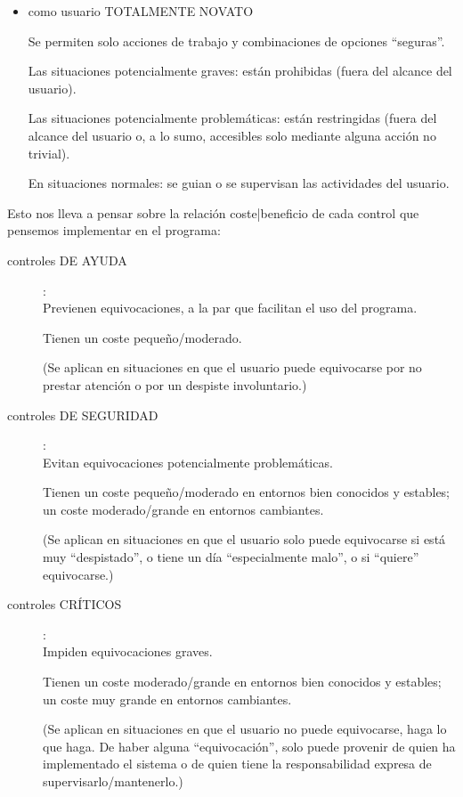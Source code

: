 \documentclass[spanish,12pt,a4paper,final,oneside]{book}
\begin{document}
\begin{itemize}
\item como usuario TOTALMENTE NOVATO

Se permiten solo acciones de trabajo y combinaciones de opciones ``seguras''.

Las situaciones potencialmente graves: están prohibidas (fuera del alcance del usuario).

Las situaciones potencialmente problemáticas: están restringidas (fuera del alcance del usuario o, a lo sumo, accesibles solo mediante alguna acción no trivial).

En situaciones normales: se guian o se supervisan las actividades del usuario.

\end{itemize}

Esto nos lleva a pensar sobre la relación coste|beneficio de cada control que pensemos implementar en el programa:
\begin{description}

\item[controles DE AYUDA]:\\Previenen equivocaciones, a la par que facilitan el uso del programa. 

Tienen un coste pequeño/moderado.

(Se aplican en situaciones en que el usuario puede equivocarse por no prestar atención o por un despiste involuntario.)

\item[controles DE SEGURIDAD]:\\Evitan equivocaciones potencialmente problemáticas. 

Tienen un coste pequeño/moderado en entornos bien conocidos y estables; un coste moderado/grande en entornos cambiantes.

(Se aplican en situaciones en que el usuario solo puede equivocarse si está muy ``despistado'', o tiene un día ``especialmente malo'', o si ``quiere'' equivocarse.)

\item[controles CRÍTICOS]:\\Impiden equivocaciones graves.

Tienen un coste moderado/grande en entornos bien conocidos y estables; un coste muy grande en entornos cambiantes.

(Se aplican en situaciones en que el usuario no puede equivocarse, haga lo que haga. De haber alguna ``equivocación'', solo puede provenir de quien ha implementado el sistema o de quien tiene la responsabilidad expresa de supervisarlo/mantenerlo.)

\end{description}
\end{document}
